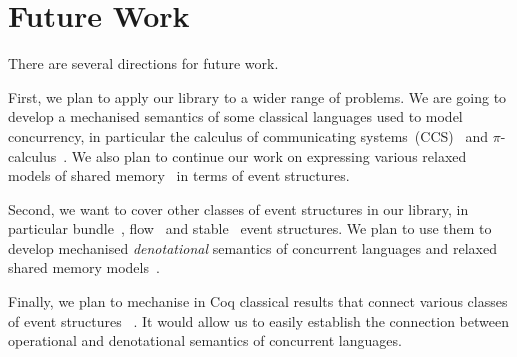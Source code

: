 \section{Future Work}

There are several directions for future work. 

First, we plan to apply our library to a wider range of problems. 
We are going to develop a mechanised semantics of some classical 
languages used to model concurrency, in particular 
the calculus of communicating systems~(CCS)~\cite{Milner:80} and 
$\pi$-calculus~\cite{Milner:99}.      
We also plan to continue our work on 
expressing various relaxed models 
of shared memory~\cite{Lahav-al:POPL16, Lahav-al:PLDI17, Podkopaev-al:POPL19}
in terms of event structures.  

Second, we want to cover other classes of event structures in our library, 
in particular bundle~\cite{Langerak:91}, flow~\cite{Boudol-Castellani:1991}
and stable~\cite{Winskel:82, Winskel:86} event structures.
We plan to use them to develop mechanised \emph{denotational} semantics 
of concurrent languages and relaxed shared memory models~\cite{Dodds-al:ESOP18}.  

Finally, we plan to mechanise in Coq classical results 
that connect various classes of event structures%
~\cite{Nielsen-al:1981, Boudol-Castellani:1991}. 
It would allow us to easily establish the connection between operational and denotational 
semantics of concurrent languages.
